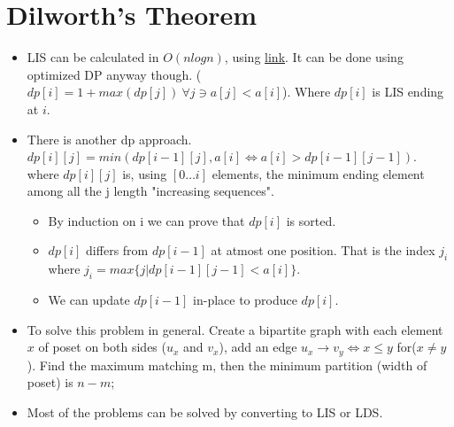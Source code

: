\documentclass[../Notes.tex]{subfiles}
\begin{document}
\section{Dilworth's Theorem}
\begin{itemize}
	\item LIS can be calculated in $O(nlogn)$, using \href{./Material/LongestIncreasingSubsequence.pdf}{link}. It can be done using optimized DP anyway though. ($dp[i]=1+max(dp[j]) \: \forall j \ni a[j]<a[i]$). Where $dp[i]$ is LIS ending at $i$.
	\item There is another dp approach. $dp[i][j]=min(dp[i-1][j],a[i] \iff a[i]>dp[i-1][j-1])$. where $dp[i][j]$ is, using $[0\ldots i]$ elements, the minimum ending element among all the j length "increasing sequences".
	\begin{itemize}
		\item By induction on i we can prove that $dp[i]$ is sorted.
		\item $dp[i]$ differs from $dp[i-1]$ at atmost one position. That is the index $j_i$ where $j_i = max\{ j| dp[i-1][j-1] < a[i] \}$.
		\item We can update $dp[i-1]$ in-place to produce $dp[i]$.
	\end{itemize}
	\item To solve this problem in general. Create a bipartite graph with each element $x$ of poset on both sides ($u_x$ and $v_x$), add an edge $u_x \rightarrow v_y \iff x\leq y$ for($x\neq y$). Find the maximum matching m, then the minimum partition (width of poset) is $n-m$;
	\item Most of the problems can be solved by converting to LIS or LDS.
\end{itemize}
\end{document}
